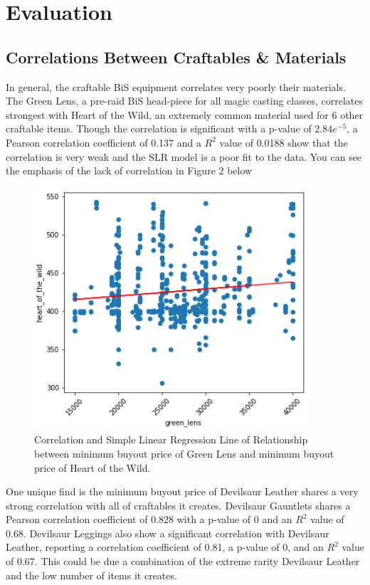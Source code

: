 \documentclass[sigconf]{acmart}
\begin{document}
\section{Evaluation}

\subsection{Correlations Between Craftables \& Materials}
In general, the craftable BiS equipment correlates very poorly their materials. The Green Lens, a pre-raid BiS head-piece for all magic casting classes, correlates strongest with Heart of the Wild, an extremely common material used for 6 other craftable items. Though the correlation is significant with a p-value of \( 2.84e^{-5} \), a Pearson correlation coefficient of 0.137 and a \( R^2 \) value of 0.0188 show that the correlation is very weak and the SLR model is a poor fit to the data. You can see the emphasis of the lack of correlation in Figure 2 below

\begin{figure}[h]
\centering
\includegraphics[width=\linewidth]{gl_hotw_corr}
\caption{Correlation and Simple Linear Regression Line of Relationship between minimum buyout price of Green Lens and minimum buyout price of Heart of the Wild.}
\end{figure}

One unique find is the minimum buyout price of Devilsaur Leather shares a very strong correlation with all of craftables it creates. Devilsaur Gauntlets shares a Pearson correlation coefficient of 0.828 with a p-value of 0 and an \( R^2 \) value of 0.68. Devilsaur Leggings also show a significant correlation with Devilsaur Leather, reporting a correlation coefficient of 0.81, a p-value of 0, and an \( R^2 \) value of 0.67. This could be due a combination of the extreme rarity Devilsaur Leather and the low number of items it creates.
\end{document}
